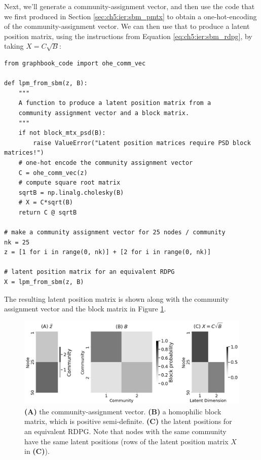Next, we'll generate a community-assignment vector, and then use the code that we first produced in Section \ref{sec:ch5:ier:sbm_pmtx} to obtain a one-hot-encoding of the community-assignment vector. We can then use that to produce a latent position matrix, using the instructions from Equation \eqref{eq:ch5:ier:sbm_rdpg}, by taking $X = C\sqrt B$:

\begin{lstlisting}[style=python]
from graphbook_code import ohe_comm_vec

def lpm_from_sbm(z, B):
    """
    A function to produce a latent position matrix from a
    community assignment vector and a block matrix.
    """
    if not block_mtx_psd(B):
        raise ValueError("Latent position matrices require PSD block matrices!")
    # one-hot encode the community assignment vector
    C = ohe_comm_vec(z)
    # compute square root matrix
    sqrtB = np.linalg.cholesky(B)
    # X = C*sqrt(B)
    return C @ sqrtB

# make a community assignment vector for 25 nodes / community
nk = 25
z = [1 for i in range(0, nk)] + [2 for i in range(0, nk)]

# latent position matrix for an equivalent RDPG
X = lpm_from_sbm(z, B)
\end{lstlisting}

The resulting latent position matrix is shown along with the community assignment vector and the block matrix in Figure \ref{fig:ch5:psd_block:sbm_lpm}.

\begin{figure}[h]
    \centering
    \includegraphics[width=\linewidth]{representations/ch5/Images/sbm_lpm.png}
    \caption[Latent position matrix for a positive semi-definite SBM]{\textbf{(A)} the community-assignment vector. \textbf{(B)} a homophilic block matrix, which is positive semi-definite. \textbf{(C)} the latent positions for an equivalent RDPG. Note that nodes with the same community have the same latent positions (rows of the latent position matrix $X$ in \textbf{(C)}).}
    \label{fig:ch5:psd_block:sbm_lpm}
\end{figure}

